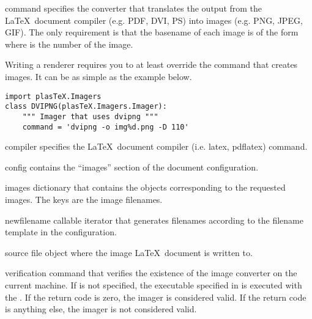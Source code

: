 \begin{memberdesc}[Imager]{command}
specifies the converter that translates the output from the \LaTeX\
document compiler (e.g. PDF, DVI, PS) into images (e.g. PNG, JPEG, GIF).
The only requirement is that the basename of each image is of the
form \file{img\%d} where \file{\%d} is the number of the image.


Writing a renderer requires you to at least override the command that
creates images.  It can be as simple as the example below.
\begin{verbatim}
import plasTeX.Imagers
class DVIPNG(plasTeX.Imagers.Imager):
    """ Imager that uses dvipng """
    command = 'dvipng -o img%d.png -D 110'
\end{verbatim}
\end{memberdesc}

\begin{memberdesc}[Imager]{compiler}
specifies the \LaTeX\ document compiler (i.e. latex, pdflatex) command.

\end{memberdesc}

\begin{memberdesc}[Imager]{config}
contains the ``images'' section of the document configuration.
\end{memberdesc}

\begin{memberdesc}[Imager]{images}
dictionary that contains the  objects corresponding to
the requested images.  The keys are the image filenames.
\end{memberdesc}

\begin{memberdesc}[Imager]{newfilename}
callable iterator that generates filenames according to the filename template
in the configuration.
\end{memberdesc}

\begin{memberdesc}[Imager]{source}
file object where the image \LaTeX\ document is written to.
\end{memberdesc}

\begin{memberdesc}[Imager]{verification}
command that verifies the existence of the image converter on the current
machine.  If \member{verification} is not specified, the executable 
specified in \member{command} is executed with the .
If the return code is zero, the imager is considered valid.  If the
return code is anything else, the imager is not considered valid.
\end{memberdesc}


